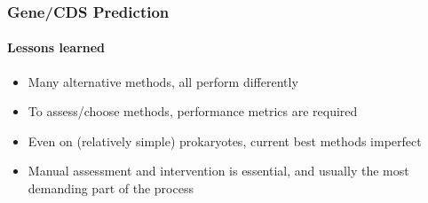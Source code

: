 \begin{frame}
   \frametitle{Gene/CDS Prediction}   
   \framesubtitle{Lessons learned}   
   \begin{itemize}
     \item Many alternative methods, all perform differently
     \item To assess/choose methods, performance metrics are required
     \item Even on (relatively simple) prokaryotes, current best methods imperfect
     \item Manual assessment and intervention is essential, and usually the most demanding part of the process
   \end{itemize}
\end{frame}